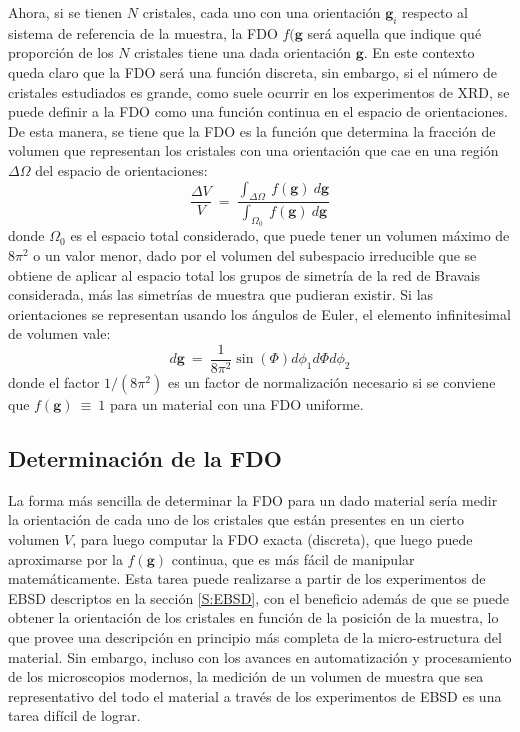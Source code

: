 Ahora, si se tienen $N$ cristales, cada uno con una orientación $\mathbf{g}_i$ respecto al sistema de referencia de la muestra, la FDO $f(\mathbf{g}$ será aquella que indique qué proporción de los $N$ cristales tiene una dada orientación $\mathbf{g}$.
En este contexto queda claro que la FDO será una función discreta, sin embargo, si el número de cristales estudiados es grande, como suele ocurrir en los experimentos de XRD, se puede definir a la FDO como una función continua en el espacio de orientaciones.
De esta manera, se tiene que la FDO es la función que determina la fracción de volumen que representan los cristales con una orientación que cae en una región $\Delta \Omega$ del espacio de orientaciones\cite{kocks2000texture}:
\begin{equation}
  \frac{\Delta V}{V} \ = \ \frac{\int_{\Delta \Omega} \ f(\mathbf{g}) \ d\mathbf{g}}{\int_{\Omega_0} \ f(\mathbf{g})\ d\mathbf{g}}
  \label{eq:ODF}
\end{equation}
\noindent
donde $\Omega_0$ es el espacio total considerado, que puede tener un volumen máximo de $8\pi^2$ o un valor menor, dado por el volumen del subespacio irreducible que se obtiene de aplicar al espacio total los grupos de simetría de la red de Bravais considerada, más las simetrías de muestra que pudieran existir.
Si las orientaciones se representan usando los ángulos de Euler, el elemento infinitesimal de volumen vale:
\begin{equation}
  d\mathbf{g} \ = \ \frac{1}{8\pi^2} \sin(\Phi) d\phi_1 d\Phi d\phi_2
  \label{eq:dg}
\end{equation}
\noindent
donde el factor $1/(8\pi^2)$ es un factor de normalización necesario si se conviene que $f(\mathbf{g}) \ \equiv \ 1$ para un material con una FDO uniforme.

\subsection{Determinación de la FDO}\label{SS:FDO}
La forma más sencilla de determinar la FDO para un dado material sería medir la orientación de cada uno de los cristales que están presentes en un cierto volumen $V$, para luego computar la FDO exacta (discreta), que luego puede aproximarse por la $f(\mathbf{g})$ continua, que es más fácil de manipular matemáticamente.
Esta tarea puede realizarse a partir de los experimentos de EBSD descriptos en la sección \ref{S:EBSD}, con el beneficio además de que se puede obtener la orientación de los cristales en función de la posición de la muestra, lo que provee una descripción en principio más completa de la micro-estructura del material.
Sin embargo, incluso con los avances en automatización y procesamiento de los microscopios modernos, la medición de un volumen de muestra que sea representativo del todo el material a través de los experimentos de EBSD es una tarea difícil de lograr.

